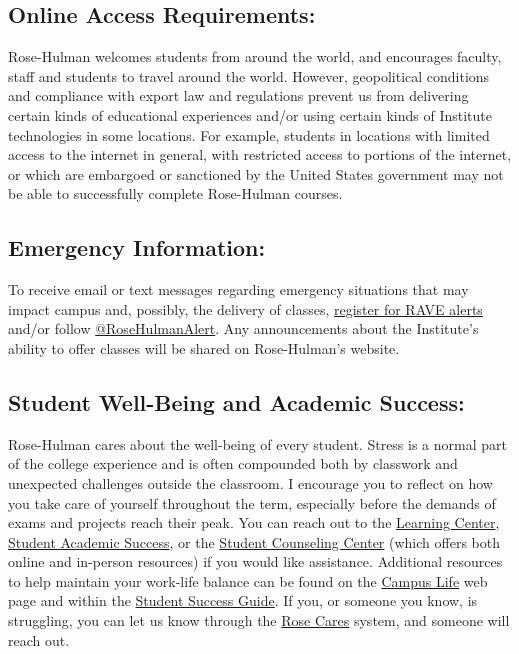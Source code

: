 \subsection*{Online Access Requirements:} 
Rose-Hulman welcomes students from around the world, 
and encourages faculty, staff and students to travel around the world.  
However, geopolitical conditions and compliance with export law and regulations 
prevent us from delivering certain kinds of educational experiences 
and/or using certain kinds of Institute technologies in some locations. 
For example, students in locations with limited access to the internet in general, 
with restricted access to portions of the internet, 
or which are embargoed or sanctioned by the United States government 
may not be able to successfully complete Rose-Hulman courses.

\subsection*{Emergency Information:} 
To receive email or text messages regarding 
emergency situations that may impact campus and, 
possibly, the delivery of classes, 
\href{https://www.getrave.com/login/rose-hulman}{register for RAVE alerts} 
and/or follow \href{https://twitter.com/RoseHulmanAlert}{@RoseHulmanAlert}. 
Any announcements about the Institute's ability to offer classes 
will be shared on Rose-Hulman's website. 

\subsection*{Student Well-Being and Academic Success:}
Rose-Hulman cares about the well-being of every student. 
Stress is a normal part of the college experience 
and is often compounded both by classwork and 
unexpected challenges outside the classroom. 
I encourage you to reflect on how you take care of yourself throughout the term, 
especially before the demands of exams and projects reach their peak.  
You can reach out to the 
\href{https://rosehulman.sharepoint.com/sites/LC/SitePages/Home.aspx}{Learning Center}, 
\href{https://rosehulman.sharepoint.com/sites/osas/SitePages/Home.aspx}{Student Academic Success}, or 
the \href{https://rosehulman.sharepoint.com/sites/counseling/SitePages/Home.aspx}{Student Counseling Center} 
(which offers both online and in-person resources) if you would like assistance. 
Additional resources to help maintain your work-life balance can be found on 
the \href{https://www.rose-hulman.edu/campus-life/index.html}{Campus Life} web page 
and within the \href{https://library.rose-hulman.edu/StudentSuccess}{Student Success Guide}. 
If you, or someone you know, is struggling, 
you can let us know through the 
\href{https://rosehulman.sharepoint.com/sites/Rosecares/SitePages/Home.aspx}{Rose Cares} 
system, and someone will reach out. 

